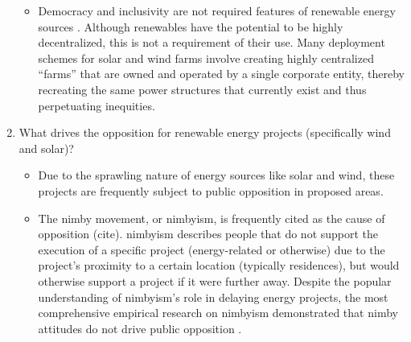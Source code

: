 \begin{enumerate}
\begin{itemize}
        \item Democracy and inclusivity are not required features of renewable
        energy sources \cite{bell_toward_2020,winner_artifacts_1980}. Although
        renewables have the potential to be highly decentralized, this is not a
        requirement of their use. Many deployment schemes for solar and wind
        farms involve creating highly centralized ``farms'' that are owned and
        operated by a single corporate entity, thereby recreating the same power
        structures that currently exist and thus perpetuating inequities.
    \end{itemize}
    \item What drives the opposition for renewable energy projects (specifically
    wind and solar)?
    \begin{itemize}
        \item Due to the sprawling nature of energy sources like solar and wind,
        these projects are frequently subject to public opposition in proposed
        areas.
        \item The \ac{nimby} movement, or \acs{nimbyism}, is frequently cited as
        the cause of opposition (cite). \ac{nimbyism} describes people that do
        not support the execution of a specific project (energy-related or
        otherwise) due to the project's proximity to a certain location
        (typically residences), but would otherwise support a project if it were
        further away. Despite the popular understanding of \ac{nimbyism}'s role
        in delaying energy projects, the most comprehensive empirical research
        on \ac{nimbyism} demonstrated that \ac{nimby} attitudes do not drive
        public opposition \cite{konisky_proximity_2021}. 
    \end{itemize}
\end{enumerate}